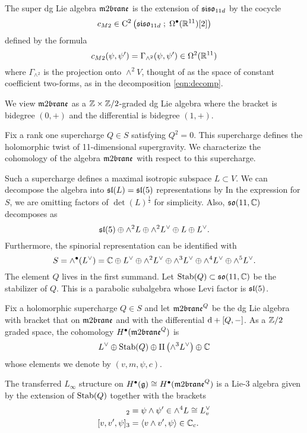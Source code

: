 \documentclass[11pt]{amsart}
\begin{document}
The super dg Lie algebra $\m2$ is the extension of $\mathfrak{siso}_{11d}$ by the cocycle
  \[
    c_{M2} \in {\rm C}^2\left(\mathfrak{siso}_{11d} \; ; \; \Omega^\bullet (\mathbb R^{11})[2]\right)
  \]
  defined by the formula 
  \[c_{M2} (\psi, \psi') = \Gamma_{\wedge^2}(\psi, \psi') \in \Omega^2(\mathbb R^{11})\]
  where $\Gamma_{\wedge^2}$ is the projection onto $\wedge^2 V$, thought of as the space of constant coefficient two-forms, as in the decomposition \eqref{eqn:decomp}.

We view $\m2$ as a $\mathbb Z \times \mathbb Z/2$-graded dg Lie algebra where the bracket is bidegree $(0,+)$ and the differential is bidegree $(1,+)$.


Fix a rank one supercharge $Q \in S$ satisfying $Q^2 = 0$.
This supercharge defines the holomorphic twist of 11-dimensional supergravity. 
We characterize the cohomology of the algebra $\m2$ with respect to this supercharge. 

Such a supercharge defines a maximal isotropic subspace $L \subset V$. 
We can decompose the algebra into $\mathfrak{sl}(L) = \mathfrak{sl}(5)$ representations by
In the expression for $S$, we are omitting factors of $\det(L)^{\frac12}$ for simplicity. 
Also, $\mathfrak{so}(11, \mathbb C)$ decomposes as
\[
\mathfrak{sl}(5) \oplus \wedge^2 L \oplus \wedge^2 L^\vee \oplus L \oplus L^\vee .
\]
Furthermore, the spinorial representation can be identified with
\[
S = \wedge^\bullet (L^\vee) = \mathbb C \oplus L^\vee \oplus \wedge^2 L^\vee \oplus \wedge^3 L^\vee \oplus \wedge^4 L^\vee \oplus \wedge^5 L^\vee .
\]
The element $Q$ lives in the first summand.
Let ${\rm Stab}(Q) \subset \mathfrak{so}(11,\mathbb C)$ be the stabilizer of $Q$. 
This is a parabolic subalgebra whose Levi factor is $\mathfrak{sl}(5)$.

\begin{prop}\label{prop:model}
Fix a holomorphic supercharge $Q \in S$ and let $\m2^Q$ be the dg Lie algebra with bracket that on $\m2$ and with the differential ${\rm d} + [Q,-]$. 
As a $\mathbb Z/2$ graded space, the cohomology $H^\bu(\m2^Q)$ is
\[
    L^\vee \oplus {\rm Stab}(Q) \oplus \Pi \left(\wedge^3 L^\vee\right) \oplus \mathbb C
  \]
whose elements we denote by $(v, m, \psi, c)$.

The transferred $L_\infty$ structure on $H^\bu(\fg) \cong H^\bu(\m2^Q)$ is a Lie-3 algebra given by the extension of ${\rm Stab}(Q)$ together with the brackets
\begin{align*}
[\psi, \psi']_2 & = \psi \wedge \psi' \in \wedge^4 L \cong L^\vee_v \\
[v, v', \psi]_3 & = \<v \wedge v', \psi\> \in \CC_c .
\end{align*}
\end{prop}
\end{document}
